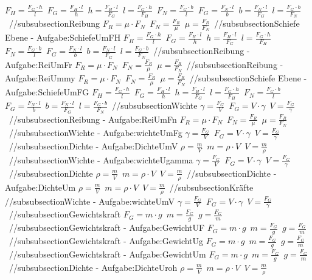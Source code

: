 $ F_{H}  = \frac{F_{G} \cdot h}{ l} $\ 
$ F_{G}  = \frac{F_{H} \cdot l}{ h} $\ 
$ h = \frac{F_{H} \cdot l}{ F_{G} } $\ 
$ l = \frac{F_{G} \cdot h}{ F_{H} } $\ 
$ F_{N}  = \frac{F_{G} \cdot b}{ l} $\ 
$ F_{G}  = \frac{F_{N} \cdot l}{ b} $\ 
$ b = \frac{F_{N} \cdot l}{ F_{G} } $\ 
$ l = \frac{F_{G} \cdot b}{ F_{N} } $\ 
//subsubsection{Reibung} 
$ F_{R}  = \mu \cdot F_{N} $\ 
$ F_{N}  = \frac{F_{R} }{\mu } $\ 
$ \mu  = \frac{F_{R} }{F_{N} } $\ 
//subsubsection{Schiefe Ebene - Aufgabe:SchiefeUmFH} 
$ F_{H}  = \frac{F_{G} \cdot h}{ l} $\ 
$ F_{G}  = \frac{F_{H} \cdot l}{ h} $\ 
$ h = \frac{F_{H} \cdot l}{ F_{G} } $\ 
$ l = \frac{F_{G} \cdot h}{ F_{H} } $\ 
$ F_{N}  = \frac{F_{G} \cdot b}{ l} $\ 
$ F_{G}  = \frac{F_{N} \cdot l}{ b} $\ 
$ b = \frac{F_{N} \cdot l}{ F_{G} } $\ 
$ l = \frac{F_{G} \cdot b}{ F_{N} } $\ 
//subsubsection{Reibung - Aufgabe:ReiUmFr} 
$ F_{R}  = \mu \cdot F_{N} $\ 
$ F_{N}  = \frac{F_{R} }{\mu } $\ 
$ \mu  = \frac{F_{R} }{F_{N} } $\ 
//subsubsection{Reibung - Aufgabe:ReiUmmy} 
$ F_{R}  = \mu \cdot F_{N} $\ 
$ F_{N}  = \frac{F_{R} }{\mu } $\ 
$ \mu  = \frac{F_{R} }{F_{N} } $\ 
//subsubsection{Schiefe Ebene - Aufgabe:SchiefeUmFG} 
$ F_{H}  = \frac{F_{G} \cdot h}{ l} $\ 
$ F_{G}  = \frac{F_{H} \cdot l}{ h} $\ 
$ h = \frac{F_{H} \cdot l}{ F_{G} } $\ 
$ l = \frac{F_{G} \cdot h}{ F_{H} } $\ 
$ F_{N}  = \frac{F_{G} \cdot b}{ l} $\ 
$ F_{G}  = \frac{F_{N} \cdot l}{ b} $\ 
$ b = \frac{F_{N} \cdot l}{ F_{G} } $\ 
$ l = \frac{F_{G} \cdot b}{ F_{N} } $\ 
//subsubsection{Wichte} 
$ \gamma  = \frac{F_{G} }{V} $\ 
$ F_{G}  = V\cdot \gamma $\ 
$ V = \frac{F_{G} }{\gamma } $\ 
//subsubsection{Reibung - Aufgabe:ReiUmFn} 
$ F_{R}  = \mu \cdot F_{N} $\ 
$ F_{N}  = \frac{F_{R} }{\mu } $\ 
$ \mu  = \frac{F_{R} }{F_{N} } $\ 
//subsubsection{Wichte - Aufgabe:wichteUmFg} 
$ \gamma  = \frac{F_{G} }{V} $\ 
$ F_{G}  = V\cdot \gamma $\ 
$ V = \frac{F_{G} }{\gamma } $\ 
//subsubsection{Dichte - Aufgabe:DichteUmV} 
$ \rho  = \frac{m}{V} $\ 
$ m = \rho \cdot V $\ 
$ V = \frac{m}{\rho } $\ 
//subsubsection{Wichte - Aufgabe:wichteUgamma} 
$ \gamma  = \frac{F_{G} }{V} $\ 
$ F_{G}  = V\cdot \gamma $\ 
$ V = \frac{F_{G} }{\gamma } $\ 
//subsubsection{Dichte} 
$ \rho  = \frac{m}{V} $\ 
$ m = \rho \cdot V $\ 
$ V = \frac{m}{\rho } $\ 
//subsubsection{Dichte - Aufgabe:DichteUm} 
$ \rho  = \frac{m}{V} $\ 
$ m = \rho \cdot V $\ 
$ V = \frac{m}{\rho } $\ 
//subsubsection{Kräfte} 
//subsubsection{Wichte - Aufgabe:wichteUmV} 
$ \gamma  = \frac{F_{G} }{V} $\ 
$ F_{G}  = V\cdot \gamma $\ 
$ V = \frac{F_{G} }{\gamma } $\ 
//subsubsection{Gewichtskraft} 
$ F_{G}  = m\cdot g $\ 
$ m = \frac{F_{G} }{g} $\ 
$ g = \frac{F_{G} }{m} $\ 
//subsubsection{Gewichtskraft - Aufgabe:GewichtUF} 
$ F_{G}  = m\cdot g $\ 
$ m = \frac{F_{G} }{g} $\ 
$ g = \frac{F_{G} }{m} $\ 
//subsubsection{Gewichtskraft - Aufgabe:GewichtUg} 
$ F_{G}  = m\cdot g $\ 
$ m = \frac{F_{G} }{g} $\ 
$ g = \frac{F_{G} }{m} $\ 
//subsubsection{Gewichtskraft - Aufgabe:GewichtUm} 
$ F_{G}  = m\cdot g $\ 
$ m = \frac{F_{G} }{g} $\ 
$ g = \frac{F_{G} }{m} $\ 
//subsubsection{Dichte - Aufgabe:DichteUroh} 
$ \rho  = \frac{m}{V} $\ 
$ m = \rho \cdot V $\ 
$ V = \frac{m}{\rho } $\ 
